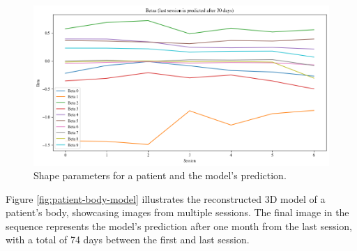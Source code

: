 \begin{figure}[h]
    \centering
    \includegraphics[width=\textwidth]{files/predicted_betas}
    \caption{Shape parameters for a patient and the model's prediction.}
    \label{fig:predicted-betas}
\end{figure}

Figure \ref{fig:patient-body-model} illustrates the reconstructed 3D model of a
patient's body, showcasing images from multiple sessions. The final image in
the sequence represents the model's prediction after one month from the last
session, with a total of 74 days between the first and last session.

